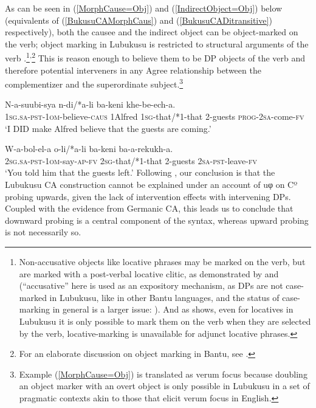 \documentclass[output=paper
,modfonts
,nonflat
]{langsci/langscibook}
\begin{document}
\z
\noindent As can be seen in (\ref{MorphCause=Obj}) and (\ref{IndirectObject=Obj}) below (equivalents of (\ref{BukusuCAMorphCaus}) and (\ref{BukusuCADitransitive}) respectively), both the causee and the indirect object can be object-marked on the verb; object marking in Lubukusu is restricted to structural arguments of the verb \citep{Diercks:2011,SikukuEt:2017}.\footnote{Non-accusative objects like locative phrases may be marked on the verb, but are marked with a post-verbal locative clitic, as demonstrated by \citet{Diercks:2010,Diercks:2011} and \citet{SikukuEt:2017} (``accusative'' here is used as an expository mechanism, as DPs are not case-marked in Lubukusu, like in other Bantu languages, and the status of case-marking in general is a larger issue: \citealt{Harford:1985,Halpert:2012,Diercks:2012,vanderwal:2015}). And as \citet{Diercks:2011} shows, even for locatives in Lubukusu it is only possible to mark them on the verb when they are selected by the verb, locative-marking is unavailable for adjunct locative phrases.}\textsuperscript{\textrm{,}}\footnote{For an elaborate discussion on object marking in Bantu, see .} This is reason enough to believe them to be DP objects of the verb and therefore potential interveners in any Agree relationship between the complementizer and the superordinate subject.\footnote{Example (\ref{MorphCause=Obj}) is translated as verum focus because doubling an object marker with an overt object is only possible in Lubukusu in a set of pragmatic contexts akin to those that elicit verum focus in English.}

\ea \label{MorphCause=Obj}
\gll N-a-suubi-sya  n-di/*a-li ba-keni khe-be-ech-a.	\\
1\textsc{sg}.\textsc{sa}-\textsc{pst}-1\textsc{om}-believe-\textsc{caus} 1Alfred 1\textsc{sg}-that/*1-that 2-guests \textsc{prog}-2\textsc{sa}-come-\textsc{fv} \\
\glt `I DID make Alfred believe that the guests are coming.'
\z

\ea \label{IndirectObject=Obj}
\gll W-a-bol-el-a o-li/*a-li ba-keni ba-a-rekukh-a. \\
2\textsc{sg}.\textsc{sa}-\textsc{pst}-1\textsc{om}-say-\textsc{ap}-\textsc{fv} {2\textsc{sg}-that/*1-that} 2-guests 2\textsc{sa}-\textsc{pst}-leave-\textsc{fv} \\
\glt `You told him that the guests left.'
\z
\noindent Following \citet{Diercks:2013}, our conclusion is that the Lubukusu CA construction cannot be explained under an account of uφ on Cº probing upwards, given the lack of intervention effects with intervening DPs. Coupled with the evidence from Germanic CA, this leads us to conclude that downward probing is a central component of the syntax, whereas upward probing is not necessarily so.  
\end{document}
